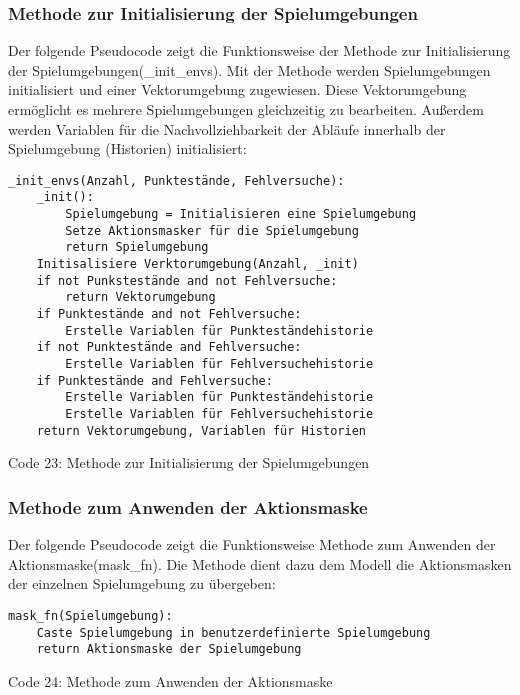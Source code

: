 \subsubsection{Methode zur Initialisierung der Spielumgebungen}
\begin{minipage}{\linewidth}
Der folgende Pseudocode zeigt die Funktionsweise der Methode zur Initialisierung der Spielumgebungen(\_init\_envs). Mit der Methode werden Spielumgebungen initialisiert und einer Vektorumgebung zugewiesen. Diese Vektorumgebung ermöglicht es mehrere Spielumgebungen gleichzeitig zu bearbeiten. Außerdem werden Variablen für die Nachvollziehbarkeit der Abläufe innerhalb der Spielumgebung (Historien) initialisiert:
\vspace{0.5cm}
\begin{lstlisting}
_init_envs(Anzahl, Punktestände, Fehlversuche):
	_init():
		Spielumgebung = Initialisieren eine Spielumgebung
		Setze Aktionsmasker für die Spielumgebung
		return Spielumgebung
	Initisalisiere Verktorumgebung(Anzahl, _init)
	if not Punkstestände and not Fehlversuche:
		return Vektorumgebung
	if Punktestände and not Fehlversuche:
		Erstelle Variablen für Punkteständehistorie
	if not Punktestände and Fehlversuche:
		Erstelle Variablen für Fehlversuchehistorie
	if Punktestände and Fehlversuche:
		Erstelle Variablen für Punkteständehistorie
		Erstelle Variablen für Fehlversuchehistorie
	return Vektorumgebung, Variablen für Historien
\end{lstlisting}
Code 23: Methode zur Initialisierung der Spielumgebungen\\
\end{minipage}

\subsubsection{Methode zum Anwenden der Aktionsmaske}
\begin{minipage}{\linewidth}
Der folgende Pseudocode zeigt die Funktionsweise Methode zum Anwenden der Aktionsmaske(mask\_fn). Die Methode dient dazu dem Modell die Aktionsmasken der einzelnen Spielumgebung zu übergeben:
\vspace{0.5cm}
\begin{lstlisting}
mask_fn(Spielumgebung):
	Caste Spielumgebung in benutzerdefinierte Spielumgebung
	return Aktionsmaske der Spielumgebung
\end{lstlisting}
Code 24: Methode zum Anwenden der Aktionsmaske\\
\end{minipage}

